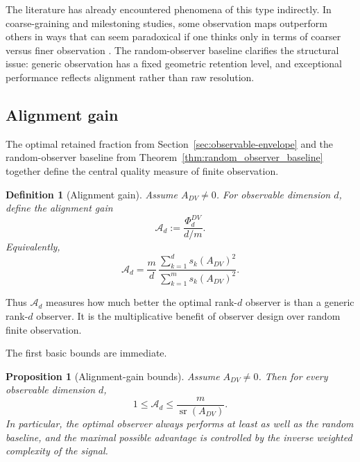 \documentclass[11pt,a4paper]{article}
\numberwithin{equation}{section}
\theoremstyle{thmcompact}
\newtheorem{proposition}[theorem]{Proposition}
\newtheorem{definition}[theorem]{Definition}
\theoremstyle{remark}
\begin{document}
The literature has already encountered phenomena of this type indirectly. In coarse-graining and milestoning studies, some observation maps outperform others in ways that can seem paradoxical if one thinks only in terms of coarser versus finer observation \cite{BlomSongVougaGodecMakarov2025}. The random-observer baseline clarifies the structural issue: generic observation has a fixed geometric retention level, and exceptional performance reflects alignment rather than raw resolution.

\subsection{Alignment gain}

The optimal retained fraction from Section~\ref{sec:observable-envelope} and the random-observer baseline from Theorem~\ref{thm:random_observer_baseline} together define the central quality measure of finite observation.

\begin{definition}[Alignment gain]
\label{def:alignment_gain}
Assume \(A_{DV}\neq 0\). For observable dimension \(d\), define the alignment gain
\begin{equation}
\mathcal A_d
:=
\frac{\Phi_d^{DV}}{d/m}.
\end{equation}
Equivalently,
\begin{equation}
\mathcal A_d
=
\frac{m}{d}\,
\frac{\sum_{k=1}^{d}s_k(A_{DV})^2}{\sum_{k=1}^{m}s_k(A_{DV})^2}.
\end{equation}
\end{definition}

Thus \(\mathcal A_d\) measures how much better the optimal rank-\(d\) observer is than a generic rank-\(d\) observer. It is the multiplicative benefit of observer design over random finite observation.

The first basic bounds are immediate.

\begin{proposition}[Alignment-gain bounds]
\label{prop:alignment_gain_bounds}
Assume \(A_{DV}\neq 0\). Then for every observable dimension \(d\),
\begin{equation}
1\le \mathcal A_d\le \frac{m}{\operatorname{sr}(A_{DV})}.
\end{equation}
In particular, the optimal observer always performs at least as well as the random baseline, and the maximal possible advantage is controlled by the inverse weighted complexity of the signal.
\end{proposition}
\end{document}
